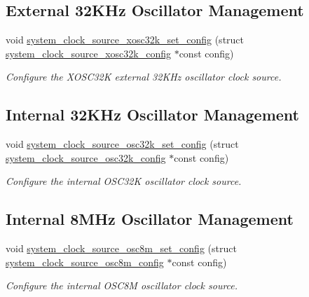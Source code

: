 \subsection*{External 32K\+Hz Oscillator Management}
\begin{DoxyCompactItemize}
\item 
void \mbox{\hyperlink{group__asfdoc__sam0__system__clock__group_ga076bff009d78de95a0b2c9672f62b224}{system\+\_\+clock\+\_\+source\+\_\+xosc32k\+\_\+set\+\_\+config}} (struct \mbox{\hyperlink{structsystem__clock__source__xosc32k__config}{system\+\_\+clock\+\_\+source\+\_\+xosc32k\+\_\+config}} $\ast$const config)
\begin{DoxyCompactList}\small\item\em Configure the X\+O\+S\+C32K external 32K\+Hz oscillator clock source. \end{DoxyCompactList}\end{DoxyCompactItemize}
\subsection*{Internal 32K\+Hz Oscillator Management}
\begin{DoxyCompactItemize}
\item 
void \mbox{\hyperlink{group__asfdoc__sam0__system__clock__group_ga9c110273354846e5a6cf877d6180296f}{system\+\_\+clock\+\_\+source\+\_\+osc32k\+\_\+set\+\_\+config}} (struct \mbox{\hyperlink{structsystem__clock__source__osc32k__config}{system\+\_\+clock\+\_\+source\+\_\+osc32k\+\_\+config}} $\ast$const config)
\begin{DoxyCompactList}\small\item\em Configure the internal O\+S\+C32K oscillator clock source. \end{DoxyCompactList}\end{DoxyCompactItemize}
\subsection*{Internal 8M\+Hz Oscillator Management}
\begin{DoxyCompactItemize}
\item 
void \mbox{\hyperlink{group__asfdoc__sam0__system__clock__group_gab96253dd348ce56a591acfcd4ecda01f}{system\+\_\+clock\+\_\+source\+\_\+osc8m\+\_\+set\+\_\+config}} (struct \mbox{\hyperlink{structsystem__clock__source__osc8m__config}{system\+\_\+clock\+\_\+source\+\_\+osc8m\+\_\+config}} $\ast$const config)
\begin{DoxyCompactList}\small\item\em Configure the internal O\+S\+C8M oscillator clock source. \end{DoxyCompactList}\end{DoxyCompactItemize}
